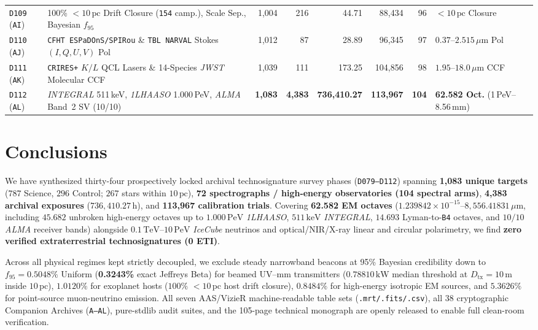 \documentclass[twocolumn,10pt]{article}
\begin{document}
\begin{table}[t]
{\begin{tabular}{llrrrrrl}
\texttt{D109} (\texttt{AI}) & 100\% $<10\,\mathrm{pc}$ Drift Closure (\texttt{154} camp.), Scale Sep., Bayesian $f_{95}$ & 1,004 & 216 & 44.71 & 88,434 & 96 & $<10\,\mathrm{pc}$ Closure \\
\texttt{D110} (\texttt{AJ}) & \texttt{CFHT ESPaDOnS/SPIRou} \& \texttt{TBL NARVAL} Stokes $(I,Q,U,V)$ Pol & 1,012 & 87 & 28.89 & 96,345 & 97 & $0.37\text{--}2.515\,\mu\text{m}$ Pol \\
\texttt{D111} (\texttt{AK}) & \texttt{CRIRES+} $K/L$ QCL Lasers \& 14-Species \textit{JWST} Molecular CCF & 1,039 & 111 & 173.25 & 104,856 & 98 & $1.95\text{--}18.0\,\mu\text{m}$ CCF \\
\texttt{D112} (\texttt{AL}) & \textit{INTEGRAL} 511\,keV, \textit{1LHAASO} 1.000\,PeV, \textit{ALMA} Band~2 SV (10/10) & \textbf{1,083} & \textbf{4,383} & \textbf{736,410.27} & \textbf{113,967} & \textbf{104} & \textbf{62.582 Oct.} (1\,PeV--8.56\,mm) \\
\bottomrule
\end{tabular}%
}
\end{table}

\section{Conclusions}
\label{sec:conclusions}
We have synthesized thirty-four prospectively locked archival technosignature survey phases (\texttt{D079--D112}) spanning \textbf{1,083 unique targets} ($787$ Science, $296$ Control; $267$ stars within $10\,\mathrm{pc}$), \textbf{72 spectrographs / high-energy observatories (104 spectral arms)}, \textbf{4,383 archival exposures} ($736{,}410.27\,\mathrm{h}$), and \textbf{113,967 calibration trials}. Covering \textbf{62.582 EM octaves} ($1.239842\times 10^{-15}\text{--}8{,}556.41831\,\mu\text{m}$, including $45.682$ unbroken high-energy octaves up to $1.000\,\mathrm{PeV}$ \textit{1LHAASO}, $511\,\mathrm{keV}$ \textit{INTEGRAL}, $14.693$ Lyman-to-\texttt{B4} octaves, and $10/10$ \textit{ALMA} receiver bands) alongside $0.1\,\mathrm{TeV}\text{--}10\,\mathrm{PeV}$ \textit{IceCube} neutrinos and optical/NIR/X-ray linear and circular polarimetry, we find \textbf{zero verified extraterrestrial technosignatures (0 ETI)}.

Across all physical regimes kept strictly decoupled, we exclude steady narrowband beacons at 95\% Bayesian credibility down to $f_{95} = \mathbf{0.5048\%}$ Uniform (\textbf{0.3243\%} exact Jeffreys Beta) for beamed UV--mm transmitters ($0.78810\,\mathrm{kW}$ median threshold at $D_{\mathrm{tx}}=10\,\mathrm{m}$ inside $10\,\mathrm{pc}$), $\mathbf{1.0120\%}$ for exoplanet hosts ($100\%$ $<10\,\mathrm{pc}$ host drift closure), $\mathbf{0.8484\%}$ for high-energy isotropic EM sources, and $\mathbf{5.3626\%}$ for point-source muon-neutrino emission. All seven AAS/VizieR machine-readable table sets (\texttt{.mrt/.fits/.csv}), all 38 cryptographic Companion Archives (\texttt{A--AL}), pure-stdlib audit suites, and the 105-page technical monograph are openly released to enable full clean-room verification.
\end{document}
